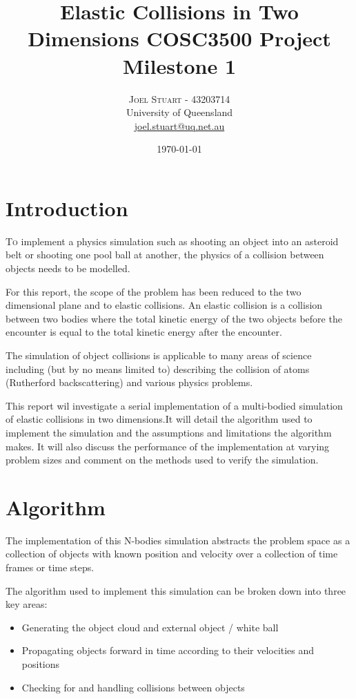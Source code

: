 \documentclass[twoside,twocolumn]{article}
\title{Elastic Collisions in Two Dimensions COSC3500 Project Milestone 1} %
\author{%
	\textsc{Joel Stuart - 43203714} \\[1ex] %
	\normalsize University of Queensland \\ %
	\normalsize \href{mailto:joel.stuart@uq.net.au}{joel.stuart@uq.net.au} %
}
\date{\today} %
\begin{document}
	
	\maketitle
	
	\section{Introduction}
	
	\lettrine[nindent=0em,lines=3]{T}o implement a physics simulation such as shooting an object into an asteroid belt or shooting one pool ball at another, the physics of a collision between objects needs to be modelled. \newline
	
	For this report, the scope of the problem has been reduced to the two dimensional plane and to elastic collisions. An elastic collision is a collision between two bodies where the total kinetic energy of the two objects before the encounter is equal to the total kinetic energy after the encounter. \newline 
	
	The simulation of object collisions is applicable to many areas of science including (but by no means limited to) describing the collision of atoms (Rutherford backscattering) and various physics problems.\newline 
	
	This report wil investigate a serial implementation of a multi-bodied simulation of elastic collisions in two dimensions.\newline It will detail the algorithm used to implement the simulation and the assumptions and limitations the algorithm makes. \newline It will also discuss the performance of the implementation at varying problem sizes and comment on the methods used to verify the simulation.
	
	
	\section{Algorithm}
	
	The implementation of this N-bodies simulation abstracts the problem space as a collection of objects with known position and velocity over a collection of time frames or time steps.
	
	The algorithm used to implement this simulation can be broken down into three key areas:
	\begin{itemize}
		\item Generating the object cloud and external object / white ball 
		\item Propagating objects forward in time according to their velocities and positions
		\item Checking for and handling collisions between objects
	\end{itemize}
	
\end{document}
